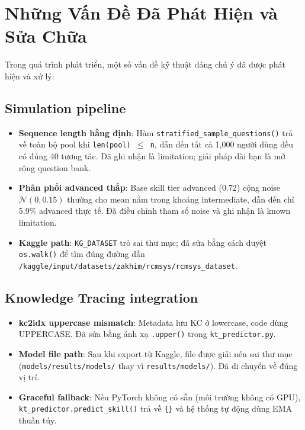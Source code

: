 \documentclass[12pt, a4paper]{report}
\begin{document}
\section{Những Vấn Đề Đã Phát Hiện và Sửa Chữa}
\label{sec:fixes}

Trong quá trình phát triển, một số vấn đề kỹ thuật đáng chú ý đã được phát hiện và xử lý:

\subsection{Simulation pipeline}
\begin{itemize}
  \item \textbf{Sequence length hằng định}: Hàm \texttt{stratified\_sample\_questions()} trả về toàn bộ pool khi \texttt{len(pool) $\leq$ n}, dẫn đến tất cả 1{,}000 người dùng đều có đúng 40 tương tác. Đã ghi nhận là limitation; giải pháp dài hạn là mở rộng question bank.
  \item \textbf{Phân phối advanced thấp}: Base skill tier advanced (0.72) cộng noise $\mathcal{N}(0, 0.15)$ thường cho mean nằm trong khoảng intermediate, dẫn đến chỉ 5.9\% advanced thực tế. Đã điều chỉnh tham số noise và ghi nhận là known limitation.
  \item \textbf{Kaggle path}: \texttt{KG\_DATASET} trỏ sai thư mục; đã sửa bằng cách duyệt \texttt{os.walk()} để tìm đúng đường dẫn \texttt{/kaggle/input/datasets/zakhim/rcmsys/rcmsys\_dataset}.
\end{itemize}

\subsection{Knowledge Tracing integration}
\begin{itemize}
  \item \textbf{kc2idx uppercase mismatch}: Metadata lưu KC ở lowercase, code dùng UPPERCASE. Đã sửa bằng ánh xạ \texttt{.upper()} trong \texttt{kt\_predictor.py}.
  \item \textbf{Model file path}: Sau khi export từ Kaggle, file được giải nén sai thư mục (\texttt{models/results/models/} thay vì \texttt{results/models/}). Đã di chuyển về đúng vị trí.
  \item \textbf{Graceful fallback}: Nếu PyTorch không có sẵn (môi trường không có GPU), \texttt{kt\_predictor.predict\_skill()} trả về \texttt{\{\}} và hệ thống tự động dùng EMA thuần túy.
\end{itemize}
\end{document}
